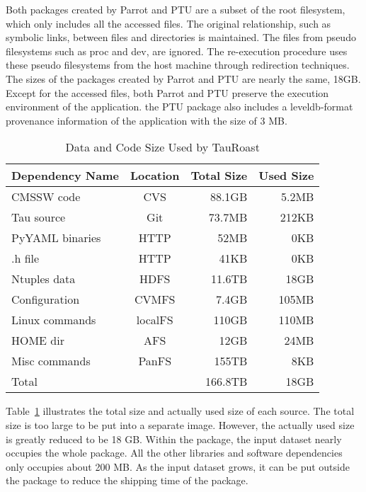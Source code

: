 Both packages created by Parrot and PTU are a subset of the root filesystem, which only includes all the accessed files. The original relationship, such as symbolic links, between files and directories is maintained. The files from pseudo filesystems such as proc and dev, are ignored. The re-execution procedure uses these pseudo filesystems from the host machine through redirection techniques.
The sizes of the packages created by Parrot and PTU are nearly the same, 18GB. 
Except for the accessed files, both Parrot and PTU preserve the execution environment of the application. 
the PTU package also includes a leveldb-format provenance information of the application with the size of 3 MB.

\begin{table}
\small
	\centering
	    \begin{tabular}{lcrr}
	        \hline
	        \bf Dependency Name & \bf Location & \bf Total Size &  \bf Used Size\\ 
	        \hline
	        CMSSW code     & CVS & 88.1GB &  5.2MB\\ \hline
	        Tau source       & Git & 73.7MB & 212KB \\ \hline
	        PyYAML binaries    & HTTP & 52MB& 0KB \\ \hline
	        .h file       & HTTP& 41KB & 0KB \\ \hline 
	        Ntuples data    & HDFS& 11.6TB & 18GB \\ \hline
	        Configuration & CVMFS & 7.4GB & 105MB \\ \hline
	        Linux commands & localFS & 110GB & 110MB \\ \hline     
	        HOME dir& AFS &12GB & 24MB\\ \hline
	        Misc commands & PanFS & 155TB & 8KB \\ \hline
	        Total      &    & 166.8TB     &  18GB \\ \hline
	    \end{tabular}
	    \normalsize
	    \caption{Data and Code Size Used by TauRoast}
	    \label{table:size-original-real}
\end{table}
	   
Table~\ref{table:size-original-real} illustrates the total size and actually used size of each source.
The total size is too large to be put into a separate image. However, the actually used size is greatly reduced to be 18 GB.
Within the package, the input dataset nearly occupies the whole package. All the other libraries and software dependencies only occupies about 200 MB.
As the input dataset grows, it can be put outside the package to reduce the shipping time of the package.

